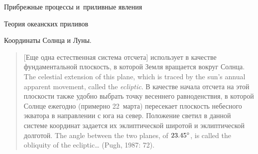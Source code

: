 \begin{chapter}{Прибрежные процессы и~приливные явления}
\begin{section}{Теория океанских приливов}
\begin{paragraph}{Координаты Солнца и Луны.}
\begin{quotation}
[Еще одна естественная система отсчета] использует в качестве фундаментальной
плоскость, в которой Земля вращается вокруг Солнца.
The celestial extension of this plane,  
which is traced by the sun's annual apparent movement, 
called the \textit{ecliptic}. 
В качестве начала отсчета на этой плоскости также удобно выбрать точку
весеннего равноденствия, в которой Солнце ежегодно (примерно 22~марта) 
пересекает плоскость небесного экватора в направлении с юга на север.
Положение светил в данной системе координат задается их эклиптической
широтой и эклиптической долготой. The angle between the two planes, of
${23.45}^\circ$, is called the obliquity of the ecliptic\dots{} 
(Pugh, 1987: 72).
%
\end{quotation}
\end{paragraph}


\end{section}
\end{chapter}
